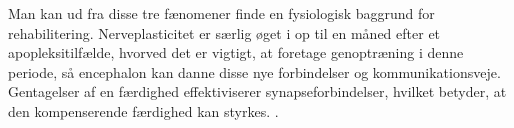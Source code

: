 Man kan ud fra disse tre fænomener finde en fysiologisk baggrund for rehabilitering. Nerveplasticitet er særlig øget i op til en måned efter et apopleksitilfælde, hvorved det er vigtigt, at foretage genoptræning i denne periode, så encephalon kan danne disse nye forbindelser og kommunikationsveje. \cite{Rugnett2015} Gentagelser af en færdighed effektiviserer synapseforbindelser, hvilket betyder, at den kompenserende færdighed kan styrkes. \cite{Stanfield2014}.

